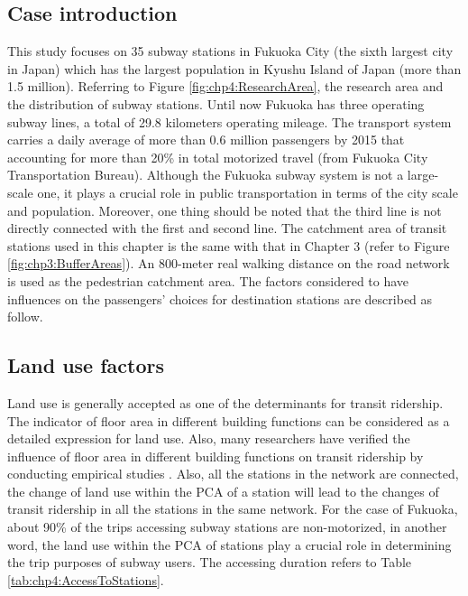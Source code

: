 \subsection{Case introduction}
%
This study focuses on 35 subway stations in Fukuoka City (the sixth largest city in Japan) which has the largest population in Kyushu Island of Japan (more than 1.5 million). Referring to Figure \ref{fig:chp4:ResearchArea}, the research area and the distribution of subway stations. Until now Fukuoka has three operating subway lines, a total of 29.8 kilometers operating mileage. The transport system carries a daily average of more than 0.6 million passengers by 2015 that accounting for more than 20\% in total motorized travel (from Fukuoka City Transportation Bureau). Although the Fukuoka subway system is not a large-scale one, it plays a crucial role in public transportation in terms of the city scale and population. Moreover, one thing should be noted that the third line is not directly connected with the first and second line. The catchment area of transit stations used in this chapter is the same with that in Chapter 3 (refer to Figure \ref{fig:chp3:BufferAreas}). An 800-meter real walking distance on the road network is used as the pedestrian catchment area. The factors considered to have influences on the passengers' choices for destination stations are described as follow.

%
\subsection{Land use factors}
%
Land use is generally accepted as one of the determinants for transit ridership. The indicator of floor area in different building functions can be considered as a detailed expression for land use. Also, many researchers have verified the influence of floor area in different building functions on transit ridership by conducting empirical studies \cite{sohn2010factors,gutierrez2011transit,chakraborty2013land,chakraborty2013land,jun2015land}. Also, all the stations in the network are connected, the change of land use within the PCA of a station will lead to the changes of transit ridership in all the stations in the same network. For the case of Fukuoka, about 90\% of the trips accessing subway stations are non-motorized, in another word, the land use within the PCA of stations play a crucial role in determining the trip purposes of subway users. The accessing duration refers to Table \ref{tab:chp4:AccessToStations}.

